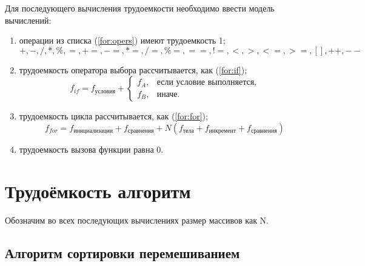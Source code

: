 Для последующего вычисления трудоемкости необходимо ввести модель вычислений:
\begin{enumerate}
	\item операции из списка (\ref{for:opers}) имеют трудоемкость 1;
	\begin{equation}
		\label{for:opers}
		+, -, /, *, \%, =, +=, -=, *=, /=, \%=, ==, !=, <, >, <=, >=, [], ++, {-}-
	\end{equation}
	\item трудоемкость оператора выбора  рассчитывается, как (\ref{for:if});
	\begin{equation}
		\label{for:if}
		f_{if} = f_{\text{условия}} +
		\begin{cases}
			f_A, & \text{если условие выполняется,}\\
			f_B, & \text{иначе.}
		\end{cases}
	\end{equation}
	\item трудоемкость цикла рассчитывается, как (\ref{for:for});
	\begin{equation}
		\label{for:for}
		f_{for} = f_{\text{инициализации}} + f_{\text{сравнения}} + N(f_{\text{тела}} + f_{\text{инкремент}} + f_{\text{сравнения}})
	\end{equation}
	\item трудоемкость вызова функции равна 0.
\end{enumerate}

\section{Трудоёмкость алгоритм}

Обозначим во всех последующих вычислениях размер массивов как N.

\subsection{Алгоритм сортировки перемешиванием}

